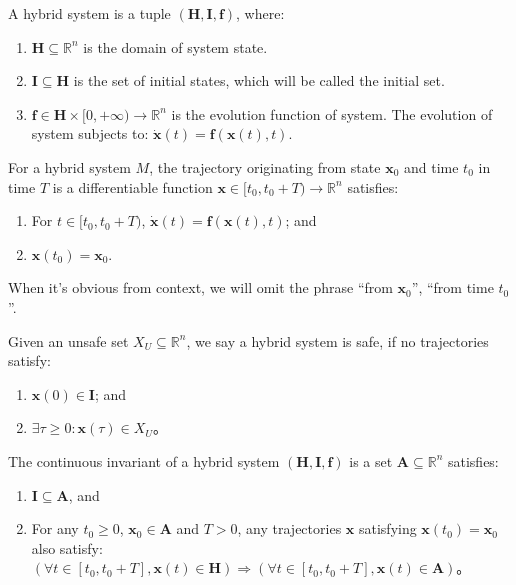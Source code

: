 \documentclass{article}
\begin{document}
\begin{Definition}
A hybrid system is a tuple $(\boldsymbol{H}, \boldsymbol{I}, \boldsymbol{f})$,  where: 
	\begin{enumerate}
		\item $\boldsymbol{H} \subseteq \mathbb{R}^n$  is the domain of system state.
		\item $\boldsymbol{I} \subseteq \boldsymbol{H}$ is the set of initial states, which will be called the initial set.
		\item $\boldsymbol{f} \in \boldsymbol{H} \times [0, +\infty) \rightarrow \mathbb{R}^n$ is the evolution function of system. The evolution of system subjects to: $\dot{\boldsymbol{x}}(t) = \boldsymbol{f}(\boldsymbol{x}(t),t)$.
	\end{enumerate}
\end{Definition}

\begin{Definition}[Trajectory]
For a hybrid system $M$, the trajectory originating from state $\boldsymbol{x}_0$ and time $t_0$ in time $T$ is a differentiable function $\boldsymbol{x} \in [t_0, t_0 + T) \rightarrow \mathbb{R}^n$ satisfies:
	\begin{enumerate}
		\item For $t \in [t_0, t_0 + T)$, $\dot{\boldsymbol{x}}(t) = \boldsymbol{f}(\boldsymbol{x}(t),t)$; and 
		\item $\boldsymbol{x}(t_0) = \boldsymbol{x}_0$.
	\end{enumerate}
	
When it's obvious from context, we will omit the phrase ``from $\boldsymbol{x}_0$'', ``from time $t_0$''.
\end{Definition}

\begin{Definition}[Safety]
Given an unsafe set $X_U \subseteq \mathbb{R}^n$,  we say a hybrid system is safe, if no trajectories satisfy: 
	\begin{enumerate}
		\item $\boldsymbol{x}(0) \in \boldsymbol{I}$; and
		\item $\exists \tau \geq 0 : \boldsymbol{x}(\tau) \in X_U$。
	\end{enumerate}
\end{Definition}

\begin{Definition}
\label{def:invariant}
The continuous invariant of a hybrid system $(\boldsymbol{H}, \boldsymbol{I}, \boldsymbol{f})$ is a set $\boldsymbol{A} \subseteq \mathbb{R}^n$ satisfies:
	\begin{enumerate}
		\item $\boldsymbol{I} \subseteq \boldsymbol{A}$, and 
		\item For any $t_0 \geq 0$, $\boldsymbol{x}_0 \in \boldsymbol{A}$ and $T > 0$, any trajectories $\boldsymbol{x}$ satisfying $\boldsymbol{x}(t_0) = \boldsymbol{x}_0$ also satisfy: $(\forall t \in [t_0, t_0 + T],\boldsymbol{x}(t) \in \boldsymbol{H}) \Rightarrow (\forall t \in [t_0,t_0 + T], \boldsymbol{x}(t) \in \boldsymbol{A})$。
	\end{enumerate}
\end{Definition}
\end{document}
